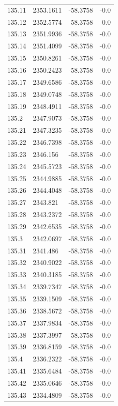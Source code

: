 \begin{table}[H]
\begin{tabular}{llll}
135.11 & 2353.1611 & -58.3758 & -0.0 \\
135.12 & 2352.5774 & -58.3758 & -0.0 \\
135.13 & 2351.9936 & -58.3758 & -0.0 \\
135.14 & 2351.4099 & -58.3758 & -0.0 \\
135.15 & 2350.8261 & -58.3758 & -0.0 \\
135.16 & 2350.2423 & -58.3758 & -0.0 \\
135.17 & 2349.6586 & -58.3758 & -0.0 \\
135.18 & 2349.0748 & -58.3758 & -0.0 \\
135.19 & 2348.4911 & -58.3758 & -0.0 \\
135.2 & 2347.9073 & -58.3758 & -0.0 \\
135.21 & 2347.3235 & -58.3758 & -0.0 \\
135.22 & 2346.7398 & -58.3758 & -0.0 \\
135.23 & 2346.156 & -58.3758 & -0.0 \\
135.24 & 2345.5723 & -58.3758 & -0.0 \\
135.25 & 2344.9885 & -58.3758 & -0.0 \\
135.26 & 2344.4048 & -58.3758 & -0.0 \\
135.27 & 2343.821 & -58.3758 & -0.0 \\
135.28 & 2343.2372 & -58.3758 & -0.0 \\
135.29 & 2342.6535 & -58.3758 & -0.0 \\
135.3 & 2342.0697 & -58.3758 & -0.0 \\
135.31 & 2341.486 & -58.3758 & -0.0 \\
135.32 & 2340.9022 & -58.3758 & -0.0 \\
135.33 & 2340.3185 & -58.3758 & -0.0 \\
135.34 & 2339.7347 & -58.3758 & -0.0 \\
135.35 & 2339.1509 & -58.3758 & -0.0 \\
135.36 & 2338.5672 & -58.3758 & -0.0 \\
135.37 & 2337.9834 & -58.3758 & -0.0 \\
135.38 & 2337.3997 & -58.3758 & -0.0 \\
135.39 & 2336.8159 & -58.3758 & -0.0 \\
135.4 & 2336.2322 & -58.3758 & -0.0 \\
135.41 & 2335.6484 & -58.3758 & -0.0 \\
135.42 & 2335.0646 & -58.3758 & -0.0 \\
135.43 & 2334.4809 & -58.3758 & -0.0 \\

\end{tabular}
\end{table}
